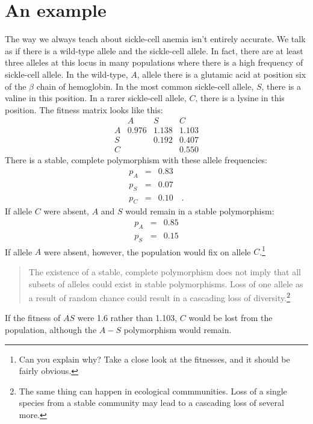 \section*{An example}

The way we always teach about sickle-cell anemia isn't entirely
accurate. We talk as if there is a wild-type allele and the
sickle-cell allele. In fact, there are at least three alleles at this
locus in many populations where there is a high frequency of
sickle-cell allele. In the wild-type, $A$, allele there is a glutamic
acid at position six of the $\beta$ chain of hemoglobin. In the most
common sickle-cell allele, $S$, there is a valine in this position. In
a rarer sickle-cell allele, $C$, there is a lysine in this
position. The fitness matrix looks like this:
\[
\begin{array}{cccc}
  & A     & S     & C \\
A & 0.976 & 1.138 & 1.103 \\
S &       & 0.192 & 0.407 \\
C &       &       & 0.550
\end{array}
\]
There is a stable, complete polymorphism with these allele frequencies:
\begin{eqnarray*}
p_A &=& 0.83 \\
p_S &=& 0.07 \\
p_C &=& 0.10 \quad .
\end{eqnarray*}
If allele $C$ were absent, $A$ and $S$ would remain in a stable
polymorphism:
\begin{eqnarray*}
p_A &=& 0.85 \\
p_S &=& 0.15
\end{eqnarray*}
If allele $A$ were absent, however, the population would fix on allele
$C$.\footnote{Can you explain why? Take a close look at the fitnesses,
  and it should be fairly obvious.}

\begin{quote}
The existence of a stable, complete polymorphism does not imply that
all subsets of alleles could exist in stable polymorphisms. Loss of
one allele as a result of random chance could result in a cascading
loss of diversity.\footnote{The same thing can happen in ecological
  commmunities. Loss of a single species from a stable community may
  lead to a cascading loss of several more.}
\end{quote}

\noindent If the fitness of $AS$ were 1.6 rather than 1.103, $C$ would
be lost from the population, although the $A-S$ polymorphism would
remain.

